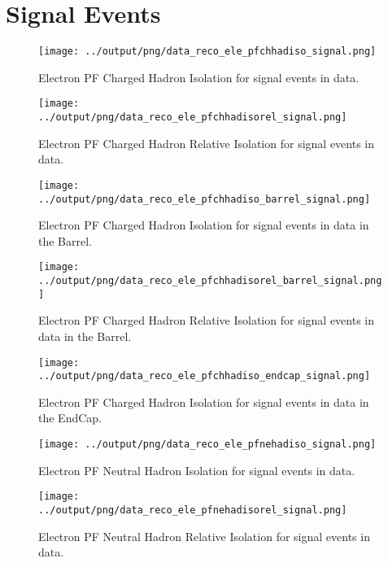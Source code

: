 \documentclass[11pt]{book}
\begin{document}
\clearpage

\section{Signal Events}

\begin{figure}[htb]
\centering
\texttt{[image: ../output/png/data\_reco\_ele\_pfchhadiso\_signal.png]}
\caption{Electron PF Charged Hadron Isolation for signal events in data.}
\label{fig:data_ele_pfchhadiso_signal}
\end{figure}

\begin{figure}[htb]
\centering
\texttt{[image: ../output/png/data\_reco\_ele\_pfchhadisorel\_signal.png]}
\caption{Electron PF Charged Hadron Relative Isolation for signal events in data.}
\label{fig:data_ele_pfchhadisorel_signal}
\end{figure}

\begin{figure}[htb]
\centering
\texttt{[image: ../output/png/data\_reco\_ele\_pfchhadiso\_barrel\_signal.png]}
\caption{Electron PF Charged Hadron Isolation for signal events in data in the Barrel.}
\label{fig:data_ele_pfchhadiso_barrel_signal}
\end{figure}

\begin{figure}[htb]
\centering
\texttt{[image: ../output/png/data\_reco\_ele\_pfchhadisorel\_barrel\_signal.png]}
\caption{Electron PF Charged Hadron Relative Isolation for signal events in data in the Barrel.}
\label{fig:data_ele_pfchhadisorel_barrel_signal}
\end{figure}

\begin{figure}[htb]
\centering
\texttt{[image: ../output/png/data\_reco\_ele\_pfchhadiso\_endcap\_signal.png]}
\caption{Electron PF Charged Hadron Isolation for signal events in data in the EndCap.}
\label{fig:data_ele_pfchhadiso_endcap_signal}
\end{figure}

\begin{figure}[htb]
\centering
\texttt{[image: ../output/png/data\_reco\_ele\_pfnehadiso\_signal.png]}
\caption{Electron PF Neutral Hadron Isolation for signal events in data.}
\label{fig:data_ele_pfnehadiso_signal}
\end{figure}

\begin{figure}[htb]
\centering
\texttt{[image: ../output/png/data\_reco\_ele\_pfnehadisorel\_signal.png]}
\caption{Electron PF Neutral Hadron Relative Isolation for signal events in data.}
\label{fig:data_ele_pfnehadisorel_signal}
\end{figure}
\end{document}
